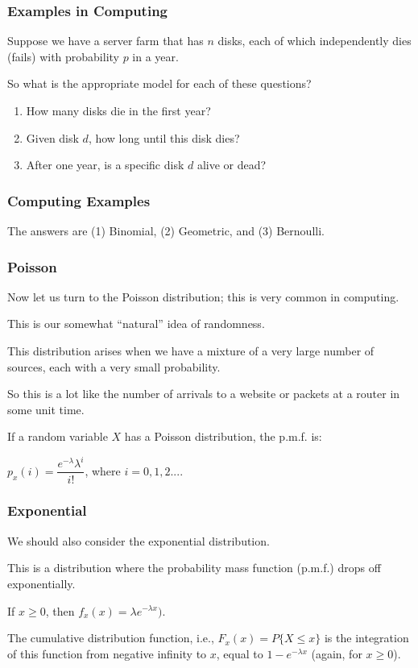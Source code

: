 \begin{frame}
\frametitle{Examples in Computing}

Suppose we have a server farm that has $n$ disks, each of which independently dies (fails) with probability $p$ in a year. 

So what is the appropriate model for each of these questions?

\begin{enumerate}
	\item How many disks die in the first year?
	\item Given disk $d$, how long until this disk dies?
	\item After one year, is a specific disk $d$ alive or dead?
\end{enumerate}

\end{frame}



\begin{frame}
\frametitle{Computing Examples}

The answers are (1) Binomial, (2) Geometric, and (3) Bernoulli.

\end{frame}



\begin{frame}
\frametitle{Poisson}

Now let us turn to the Poisson distribution; this is very common in computing. 

This is our somewhat ``natural'' idea of randomness. 

This distribution arises when we have a mixture of a very large number of sources, each with a very small probability. 

So this is a lot like the number of arrivals to a website or packets at a router in some unit time. 

If a random variable $X$ has a Poisson distribution, the p.m.f. is:

\begin{center}
	$p_{x}(i) = \dfrac{e^{-\lambda}\lambda^{i}}{i!}$, where $i = 0, 1, 2....$
\end{center}

\end{frame}



\begin{frame}
\frametitle{Exponential}

We should also consider the exponential distribution. 

This is a distribution where the probability mass function (p.m.f.) drops off exponentially. 

If $x \geq 0$, then $f_{x}(x) = \lambda e^{-\lambda x})$. 

The cumulative distribution function, i.e., $F_{x}(x) = P\{ X \leq x \}$ is the integration of this function from negative infinity to $x$, equal to $1-e^{-\lambda x}$ (again, for $x \geq 0$). 

\end{frame}



